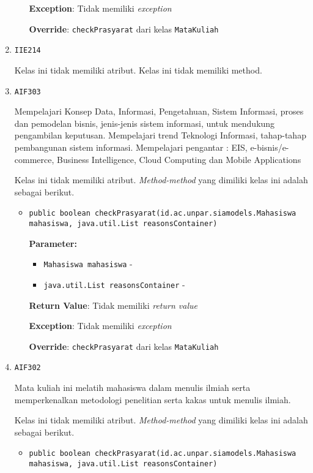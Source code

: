 \documentclass{article}
\begin{document}
\begin{enumerate}
\begin{itemize}
\textbf{Exception}: Tidak memiliki \textit{exception}

\textbf{Override}: \texttt{checkPrasyarat} dari kelas \texttt{MataKuliah}

\end{itemize}
\item \texttt{IIE214}



Kelas ini tidak memiliki atribut. Kelas ini tidak memiliki method. \item \texttt{AIF303}

Mempelajari Konsep Data, Informasi, Pengetahuan, Sistem Informasi, proses dan
 pemodelan bisnis, jenis-jenis sistem informasi, untuk mendukung pengambilan
 keputusan. Mempelajari trend Teknologi Informasi, tahap-tahap pembangunan
 sistem informasi. Mempelajari pengantar : EIS, e-bisnis/e-commerce, Business
 Intelligence, Cloud Computing dan Mobile Applications

Kelas ini tidak memiliki atribut. \textit{Method-method} yang dimiliki kelas ini adalah sebagai berikut.
\begin{itemize}
\item \texttt{public boolean checkPrasyarat(id.ac.unpar.siamodels.Mahasiswa mahasiswa, java.util.List reasonsContainer)}

\textbf{Parameter:}
\begin{itemize}
\item \texttt{Mahasiswa mahasiswa} - 
\item \texttt{java.util.List reasonsContainer} - 
\end{itemize}
\textbf{Return Value}: Tidak memiliki \textit{return value}

\textbf{Exception}: Tidak memiliki \textit{exception}

\textbf{Override}: \texttt{checkPrasyarat} dari kelas \texttt{MataKuliah}

\end{itemize}
\item \texttt{AIF302}

Mata kuliah ini melatih mahasiswa dalam menulis ilmiah serta memperkenalkan
 metodologi penelitian serta kakas untuk menulis ilmiah.

Kelas ini tidak memiliki atribut. \textit{Method-method} yang dimiliki kelas ini adalah sebagai berikut.
\begin{itemize}
\item \texttt{public boolean checkPrasyarat(id.ac.unpar.siamodels.Mahasiswa mahasiswa, java.util.List reasonsContainer)}


\end{itemize}
\end{enumerate}
\end{document}
